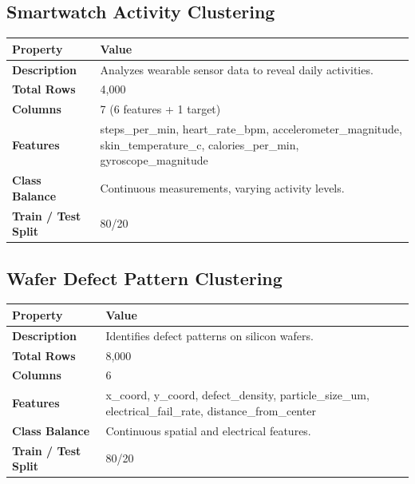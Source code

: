 \documentclass[11pt,a4paper]{article}
\begin{document}
\subsection{Smartwatch Activity Clustering}

\begin{tabularx}{\linewidth}{@{}>{\bfseries}l X @{}}
  \arrayrulecolor{tableheader}
  \toprule
  \rowcolor{tableheader} Property & Value \\
  \midrule
  \rowcolor{white} Description & Analyzes wearable sensor data to reveal daily activities. \\
  \rowcolor{tablerow} Total Rows & 4,000 \\
  \rowcolor{white} Columns & 7 (6 features + 1 target) \\
  \rowcolor{tablerow} Features & steps\_per\_min, heart\_rate\_bpm, accelerometer\_magnitude, skin\_temperature\_c, calories\_per\_min, gyroscope\_magnitude \\
  \rowcolor{white} Class Balance & Continuous measurements, varying activity levels. \\
  \rowcolor{tablerow} Train / Test Split & 80/20 \\
  \bottomrule
\end{tabularx}

\vspace{6pt}

\subsection{Wafer Defect Pattern Clustering}

\begin{tabularx}{\linewidth}{@{}>{\bfseries}l X @{}}
  \arrayrulecolor{tableheader}
  \toprule
  \rowcolor{tableheader} Property & Value \\
  \midrule
  \rowcolor{white} Description & Identifies defect patterns on silicon wafers. \\
  \rowcolor{tablerow} Total Rows & 8,000 \\
  \rowcolor{white} Columns & 6 \\
  \rowcolor{tablerow} Features & x\_coord, y\_coord, defect\_density, particle\_size\_um, electrical\_fail\_rate, distance\_from\_center \\
  \rowcolor{white} Class Balance & Continuous spatial and electrical features. \\
  \rowcolor{tablerow} Train / Test Split & 80/20 \\
  \bottomrule
\end{tabularx}
\end{document}
